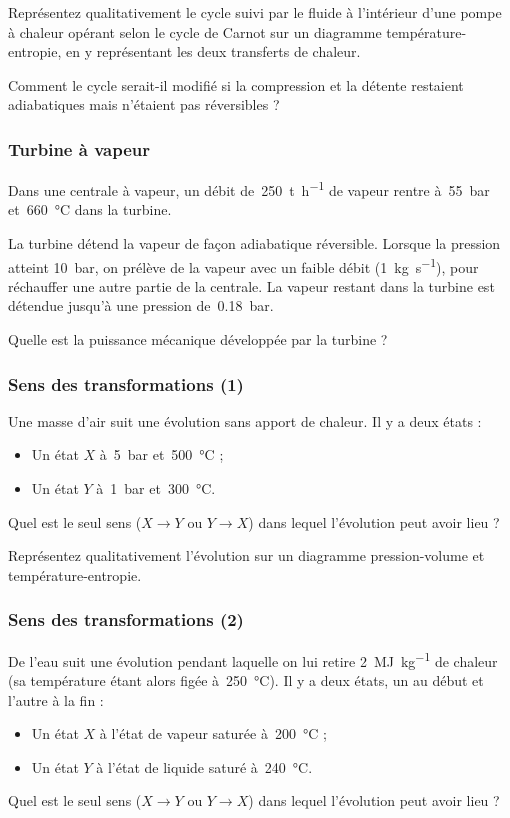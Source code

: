 	Représentez qualitativement le cycle suivi par le fluide à l’intérieur d’une pompe à chaleur opérant selon le cycle de Carnot sur un diagramme température-entropie, en y représentant les deux transferts de chaleur.
	
	Comment le cycle serait-il modifié si la compression et la détente restaient adiabatiques mais n’étaient pas réversibles ?

\subsubsection{Turbine à vapeur}

	Dans une centrale à vapeur, un débit de~\SI{250}{\tonne\per\hour} de vapeur rentre à~\SI{55}{\bar} et~\SI{660}{\degreeCelsius} dans la turbine.
	
	La turbine détend la vapeur de façon adiabatique réversible. Lorsque la pression atteint \SI{10}{\bar}, on prélève de la vapeur avec un faible débit (\SI{1}{\kilogram\per\second}), pour réchauffer une autre partie de la centrale. La vapeur restant dans la turbine est détendue jusqu’à une pression de~\SI{0,18}{\bar}.
	
	Quelle est la puissance mécanique développée par la turbine ?

\subsubsection{Sens des transformations (1)}

	Une masse d’air suit une évolution sans apport de chaleur. Il y a deux états :
		\begin{itemize}
			\item Un état $X$ à~\SI{5}{\bar} et~\SI{500}{\degreeCelsius} ;
			\item Un état $Y$ à~\SI{1}{\bar} et~\SI{300}{\degreeCelsius}.
		\end{itemize}
		
	Quel est le seul sens ($X \to Y$ ou $Y \to X$) dans lequel l’évolution peut avoir lieu ?
	
	Représentez qualitativement l’évolution sur un diagramme pression-volume et température-entropie.

\subsubsection{Sens des transformations (2)}

	De l’eau suit une évolution pendant laquelle on lui retire \SI{2}{\mega\joule\per\kilogram} de chaleur (sa température étant alors figée à~\SI{250}{\degreeCelsius}). Il y a deux états, un au début et l’autre à la fin :
		\begin{itemize}
			\item Un état $X$ à l’état de vapeur saturée à~\SI{200}{\degreeCelsius} ;
			\item Un état $Y$ à l’état de liquide saturé à~\SI{240}{\degreeCelsius}.
		\end{itemize}
	Quel est le seul sens ($X \to Y$ ou $Y \to X$) dans lequel l’évolution peut avoir lieu ?

